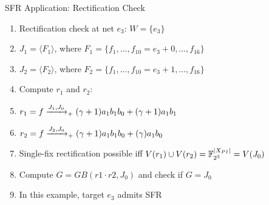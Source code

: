 \begin{frame}{\large SFR Application: Rectification Check}
	\vspace{0.1in}
	\begin{enumerate}
		\item Rectification check at net $e_3$: $W = \{e_3\}$
		\bi
			\item $J_1 = \langle F_1\rangle$, where $F_1=\{f_1,\dots, f_{10}=e_3+0,\dots, f_{16}\}$
			\item $J_2 = \langle F_2\rangle$, where $F_2 = \{f_1,\dots, f_{10}=e_3+1,\dots, f_{16}\}$
		\ei
		\vspace{0.1in}
		\item Compute $r_1$ and $r_2$:
		\bi
			\item $r_1 = f \xrightarrow[]{J_1, J_0}_+{(\gamma+1)a_1b_1b_0+(\gamma+1)a_1b_1}$
			\item $r_2 = f \xrightarrow[]{J_2,J_0}_+{(\gamma+1)a_1b_1b_0+(\gamma)a_1b_0}$
		\ei
		\vspace{0.1in}
		\item Single-fix rectification possible iff $V(r_1) \cup V(r_2) = {\mathbb{F}}_{2^3}^{|X_{PI}|} = V(J_0)$
		\bi
			\item Compute $G = GB(r1\cdot r2, J_0)$ and check if $G=J_0$
			\item In this example, target $e_3$ admits SFR
		\ei
	\end{enumerate}
\end{frame}

